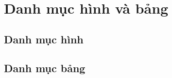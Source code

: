 \documentclass[12pt,a4paper,oneside]{extreport}
\begin{document}
\hypersetup{pageanchor=false}

\clearpage
\tableofcontents
\clearpage
\chapter*{Danh mục hình và bảng}
\begingroup
\fontsize{11}{13}\selectfont
\section*{Danh mục hình}
\makeatletter\begingroup\let\addvspace\@gobble{}\endgroup\makeatother
\section*{Danh mục bảng}
\makeatletter\begingroup\let\addvspace\@gobble{}\endgroup\makeatother
\endgroup
\clearpage
{}







\appendix
\renewcommand{\chaptermark}[1]{\markboth{Phụ lục \thechapter}{}}

\end{document}
